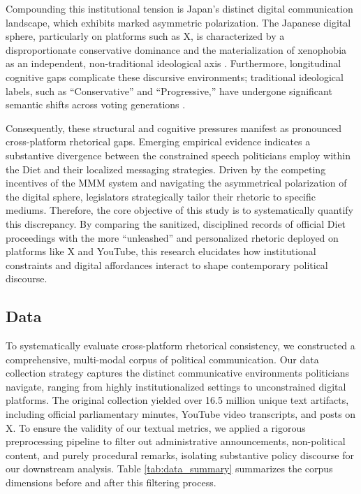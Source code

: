 \documentclass[11pt,letterpaper]{article}
\theoremstyle{plain}
\begin{document}
Compounding this institutional tension is Japan's distinct digital communication landscape, which exhibits marked asymmetric polarization. The Japanese digital sphere, particularly on platforms such as X, is characterized by a disproportionate conservative dominance \citep{yoshida2021japanese} and the materialization of xenophobia as an independent, non-traditional ideological axis \citep{takikawa2017moral}. Furthermore, longitudinal cognitive gaps complicate these discursive environments; traditional ideological labels, such as ``Conservative'' and ``Progressive,'' have undergone significant semantic shifts across voting generations \citep{jou2016generational}.

Consequently, these structural and cognitive pressures manifest as pronounced cross-platform rhetorical gaps. Emerging empirical evidence indicates a substantive divergence between the constrained speech politicians employ within the Diet \citep{kaneko2026extracting}and their localized messaging strategies. Driven by the competing incentives of the MMM system and navigating the asymmetrical polarization of the digital sphere, legislators strategically tailor their rhetoric to specific mediums. Therefore, the core objective of this study is to systematically quantify this discrepancy. By comparing the sanitized, disciplined records of official Diet proceedings with the more ``unleashed'' and personalized rhetoric deployed on platforms like X and YouTube, this research elucidates how institutional constraints and digital affordances interact to shape contemporary political discourse.
\subsection{Data}
To systematically evaluate cross-platform rhetorical consistency, we constructed a comprehensive, multi-modal corpus of political communication. Our data collection strategy captures the distinct communicative environments politicians navigate, ranging from highly institutionalized settings to unconstrained digital platforms. The original collection yielded over 16.5 million unique text artifacts, including official parliamentary minutes, YouTube video transcripts, and posts on X. To ensure the validity of our textual metrics, we applied a rigorous preprocessing pipeline to filter out administrative announcements, non-political content, and purely procedural remarks, isolating substantive policy discourse for our downstream analysis. Table \ref{tab:data_summary} summarizes the corpus dimensions before and after this filtering process.
\end{document}
